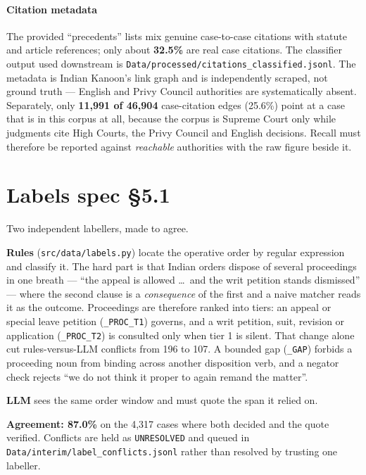 \documentclass[12pt,a4paper]{article}
\newcommand{\code}[1]{\texttt{\small #1}}
\newcommand{\spec}[1]{\textbf{spec §#1}}
\begin{document}
\paragraph{Citation metadata} The provided ``precedents'' lists mix genuine case-to-case citations
with statute and article references; only about \textbf{32.5\%} are real case citations. The
classifier output used downstream is
\code{Data/processed/citations\_classified.jsonl}. The metadata is Indian Kanoon's link graph and is
independently scraped, not ground truth --- English and Privy Council authorities are systematically
absent. Separately, only \textbf{11,991 of 46,904} case-citation edges (25.6\%) point at a case that
is in this corpus at all, because the corpus is Supreme Court only while judgments cite High Courts,
the Privy Council and English decisions. Recall must therefore be reported against \emph{reachable}
authorities with the raw figure beside it.

\section{Labels \spec{5.1}}\label{sec:labels}

Two independent labellers, made to agree.

\textbf{Rules} (\code{src/data/labels.py}) locate the operative order by regular expression and
classify it. The hard part is that Indian orders dispose of several proceedings in one breath ---
``the appeal is allowed \ldots\ and the writ petition stands dismissed'' --- where the second clause
is a \emph{consequence} of the first and a naive matcher reads it as the outcome. Proceedings are
therefore ranked into tiers: an appeal or special leave petition (\code{\_PROC\_T1}) governs, and a
writ petition, suit, revision or application (\code{\_PROC\_T2}) is consulted only when tier 1 is
silent. That change alone cut rules-versus-LLM conflicts from 196 to 107. A bounded gap
(\code{\_GAP}) forbids a proceeding noun from binding across another disposition verb, and a negator
check rejects ``we do not think it proper to again remand the matter''.

\textbf{LLM} sees the same order window and must quote the span it relied on.

\textbf{Agreement: 87.0\%} on the 4,317 cases where both decided and the quote verified. Conflicts
are held as \code{UNRESOLVED} and queued in \code{Data/interim/label\_conflicts.jsonl} rather than
resolved by trusting one labeller.
\end{document}
